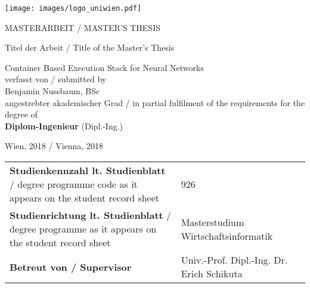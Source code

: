 
\pagestyle{empty}

\clearscrheadings\clearscrplain

\begin{flushright} 
	\texttt{[image: images/logo\_uniwien.pdf]}\\
\end{flushright}

\begin{center}
\begin{Huge}
MASTERARBEIT / MASTER'S THESIS\\
\vspace{3mm}
\end{Huge}

\vspace{10mm}
{\small Titel der Arbeit / Title of the Master's Thesis}\\
\begin{Large}
Container Based Execution Stack for Neural Networks\\
\vspace{15mm}
{\small verfasst von / submitted by}\\
Benjamin Nussbaum, BSc \\

\vspace{10mm}
{\small angestrebter akademischer Grad / in partial fulfilment of the requirements for the degree of} \\
{\textbf{Diplom-Ingenieur}} (Dipl.-Ing.)\\
\end{Large}
\end{center}

\vspace{8mm}

Wien, 2018 / Vienna, 2018\\[12mm]
\renewcommand{\arraystretch}{1.2}
\begin{tabular}{p{8cm}ll}
{\textbf{Studienkennzahl lt. Studienblatt} / \newline
degree programme code as it appears on \newline the student record sheet} & 926 \\
{\textbf{Studienrichtung lt. Studienblatt} / \newline degree programme as it appears on \newline the student record sheet} & Masterstudium Wirtschaftsinformatik  \\
{\textbf{Betreut von / Supervisor}} & Univ.-Prof. Dipl.-Ing. Dr. Erich Schikuta
\end{tabular}


